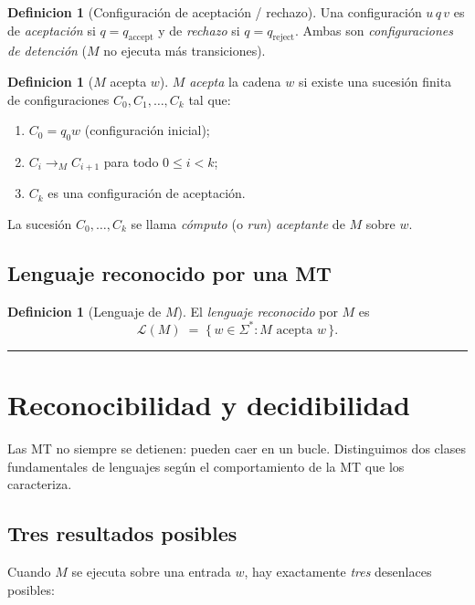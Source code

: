 \documentclass[11pt,a4paper]{article}
\theoremstyle{plain}
\theoremstyle{definition}
\newtheorem{definicion}[teorema]{Definicion}
\theoremstyle{remark}
\newcommand{\lang}{\mathcal{L}}
\newcommand{\Sstar}{\Sigma^{*}}
\newcommand{\qaccept}{q_{\text{accept}}}
\newcommand{\qreject}{q_{\text{reject}}}
\begin{document}
\begin{definicion}[Configuraci\'on de aceptaci\'on / rechazo]
Una configuraci\'on $u\,q\,v$ es de \emph{aceptaci\'on} si $q=\qaccept$ y de
\emph{rechazo} si $q=\qreject$. Ambas son \emph{configuraciones de
detenci\'on} ($M$ no ejecuta m\'as transiciones).
\end{definicion}

\begin{definicion}[$M$ acepta $w$]
\label{def:acepta}
$M$ \emph{acepta} la cadena $w$ si existe una sucesi\'on finita de
configuraciones $C_0,C_1,\dots,C_k$ tal que:
\begin{enumerate}
  \item $C_0 = q_0 w$ (configuraci\'on inicial);
  \item $C_i \to_M C_{i+1}$ para todo $0\le i < k$;
  \item $C_k$ es una configuraci\'on de aceptaci\'on.
\end{enumerate}
La sucesi\'on $C_0,\dots,C_k$ se llama \emph{c\'omputo} (o \emph{run})
\emph{aceptante} de $M$ sobre $w$.
\end{definicion}

\subsection{Lenguaje reconocido por una MT}

\begin{definicion}[Lenguaje de $M$]
El \emph{lenguaje reconocido} por $M$ es
\[
  \lang(M) \;=\; \{\,w\in\Sstar : M \text{ acepta } w\,\}.
\]
\end{definicion}

\bigskip\hrule\bigskip

\section{Reconocibilidad y decidibilidad}
\label{sec:rec-dec}

Las MT no siempre se detienen: pueden caer en un bucle. Distinguimos dos
clases fundamentales de lenguajes seg\'un el comportamiento de la MT que los
caracteriza.

\subsection{Tres resultados posibles}

Cuando $M$ se ejecuta sobre una entrada $w$, hay exactamente \emph{tres}
desenlaces posibles:
\end{document}
